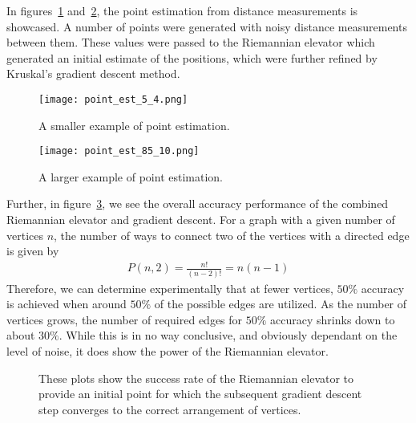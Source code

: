 In figures~\ref{fig:point-est-small} and~\ref{fig:point-est-large}, the point estimation from distance measurements is showcased. A number of points were generated with noisy distance measurements between them. These values were passed to the Riemannian elevator which generated an initial estimate of the positions, which were further refined by Kruskal's gradient descent method.
\begin{figure}[ht]
    \centering
    \texttt{[image: point\_est\_5\_4.png]}
    \caption{A smaller example of point estimation.}
    \label{fig:point-est-small}
\end{figure}
\begin{figure}[ht]
    \centering
    \texttt{[image: point\_est\_85\_10.png]}
    \caption{A larger example of point estimation.}
    \label{fig:point-est-large}
\end{figure}
Further, in figure~\ref{fig:RE-accuracy}, we see the overall accuracy performance of the combined Riemannian elevator and gradient descent. For a graph with a given number of vertices $n$, the number of ways to connect two of the vertices with a directed edge is given by 
\begin{align}
    P(n, 2) = \frac{n!}{(n-2)!} = n (n-1)
\end{align}
Therefore, we can determine experimentally that at fewer vertices, $50\%$ accuracy is achieved when around $50\%$ of the possible edges are utilized. As the number of vertices grows, the number of required edges for $50\%$ accuracy shrinks down to about $30\%$. While this is in no way conclusive, and obviously dependant on the level of noise, it does show the power of the Riemannian elevator. 
\begin{figure}[ht]
    \centering
    
    \caption{These plots show the success rate of the Riemannian elevator to provide an initial point for which the subsequent gradient descent step converges to the correct arrangement of vertices.}
    \label{fig:RE-accuracy}
\end{figure}

